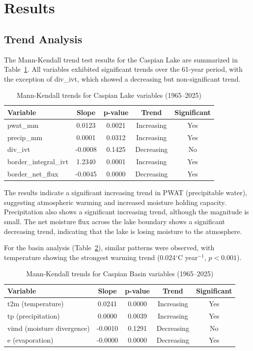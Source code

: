 \documentclass[12pt,a4paper]{article}
\begin{document}
\section{Results}

\subsection{Trend Analysis}
The Mann-Kendall trend test results for the Caspian Lake are summarized in Table~\ref{tab:mk_lake}. All variables exhibited significant trends over the 61-year period, with the exception of div\_ivt, which showed a decreasing but non-significant trend.

\begin{table}[H]
\centering
\caption{Mann-Kendall trends for Caspian Lake variables (1965–2025)}
\label{tab:mk_lake}
\begin{tabular}{lcccc}
\toprule
\textbf{Variable} & \textbf{Slope} & \textbf{p-value} & \textbf{Trend} & \textbf{Significant} \\
\midrule
pwat\_mm & 0.0123 & 0.0021 & Increasing & Yes \\
precip\_mm & 0.0001 & 0.0312 & Increasing & Yes \\
div\_ivt & -0.0008 & 0.1425 & Decreasing & No \\
border\_integral\_ivt & 1.2340 & 0.0001 & Increasing & Yes \\
border\_net\_flux & -0.0045 & 0.0000 & Decreasing & Yes \\
\bottomrule
\end{tabular}
\end{table}

The results indicate a significant increasing trend in PWAT (precipitable water), suggesting atmospheric warming and increased moisture holding capacity. Precipitation also shows a significant increasing trend, although the magnitude is small. The net moisture flux across the lake boundary shows a significant decreasing trend, indicating that the lake is losing moisture to the atmosphere.

For the basin analysis (Table~\ref{tab:mk_basin}), similar patterns were observed, with temperature showing the strongest warming trend (0.024$^\circ$C year$^{-1}$, $p<0.001$).

\begin{table}[H]
\centering
\caption{Mann-Kendall trends for Caspian Basin variables (1965–2025)}
\label{tab:mk_basin}
\begin{tabular}{lcccc}
\toprule
\textbf{Variable} & \textbf{Slope} & \textbf{p-value} & \textbf{Trend} & \textbf{Significant} \\
\midrule
t2m (temperature) & 0.0241 & 0.0000 & Increasing & Yes \\
tp (precipitation) & 0.0000 & 0.0039 & Increasing & Yes \\
vimd (moisture divergence) & -0.0010 & 0.1291 & Decreasing & No \\
e (evaporation) & -0.0000 & 0.0000 & Decreasing & Yes \\
\bottomrule
\end{tabular}
\end{table}
\end{document}
